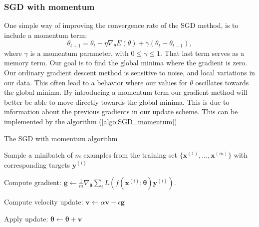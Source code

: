 \subsubsection{SGD with momentum}
One simple way of improving the convergence rate of the SGD method, is to
include a momentum term: 
\begin{equation*}
    \theta _{t+1} = \theta _t - \eta \nabla_\theta E(\theta )+\gamma (\theta_t
    -\theta_{t-1}     ) ,
\end{equation*}
where $\gamma $ is a momentum parameter, with $0\leq \gamma \leq1$. That last
term serves as a memory term. Our goal is to find the
global minima where the gradient is zero. Our ordinary gradient descent method
is sensitive to noise, and local variations in our data.
This often lead to a behavior where our values for $\theta $ oscillates
towards the global minima. %
By introducing a momentum term our gradient method will better be able to move
directly towards the global minima. This is due to information about the previous
gradients in our update scheme. This can be implemented by the algorithm
(\ref{algo:SGD_momentum})  

\begin{algorithm}
\caption{The SGD with momentum algorithm}\label{algo:SGD_momentum}
\begin{algorithmic}


         Sample a minibatch of $m$ examples from the training set
        $\{\boldsymbol{x}^{(1)}, ..., \boldsymbol{x}^{(m)}\}$ with corresponding
        targets $\boldsymbol{y}^{(i)}$
        
        Compute gradient: $\boldsymbol{g} \gets
        \frac{1}{m}\nabla_{\boldsymbol\theta}
        \sum_{i}L(f(\boldsymbol{x}^{(i)};\boldsymbol{\theta})\boldsymbol{y}^{(i)})$.
        
        Compute velocity update: $\boldsymbol{v} \gets \alpha\boldsymbol{v} -
        \epsilon\boldsymbol{g}$

        Apply update: $\boldsymbol{\theta} \gets
        \boldsymbol{\theta}+\boldsymbol{v}$
    \EndWhile
\end{algorithmic}
\end{algorithm}




